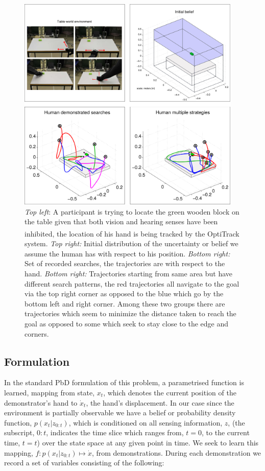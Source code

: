 \begin{figure}
\centering
  \includegraphics[width=0.95\textwidth]{./ch3-Search/Figures/Figure2}
  \caption{\textit{Top left}: A participant is trying to locate the green wooden block on the table
given that both vision and hearing senses have been inhibited, the location of his hand is being tracked by the
OptiTrack\textsuperscript{\textregistered} system. \textit{Top right:} Initial distribution of the uncertainty or belief we assume
the human has with respect to his position. \textit{Bottom right:} Set of recorded searches, the trajectories are with respect to the hand.
\textit{Bottom right:} Trajectories starting from same area but have different search patterns, the red trajectories all navigate to the goal
via the top right corner as opposed to the blue which go by the bottom left and right corner. Among these two groups there are trajectories which
seem to minimize the distance taken to reach the goal as opposed to some which seek to stay close to the edge and corners.}
\label{fig:experiment}
\end{figure}

\subsection{Formulation}

In the standard PbD formulation of this problem, a parametrised function is learned,
mapping from state, $x_t$, which denotes the current position of the demonstrator's hand to $\dot{x}_t$, the hand's displacement. 
In our case since the environment is partially observable we have a belief or probability density function, $p(x_{t}|z_{0:t})$, which is conditioned on all sensing information, $z$, (the subscript, $0:t$, indicates
the time slice which ranges from, $t=0$, to the current time, $t=t$) over the state space at any given point in time.
We seek to learn this mapping, $f : p(x_{t}|z_{0:t}) \mapsto \dot{x}$,  from demonstrations. During each demonstration we record a set of variables consisting of the
following:

